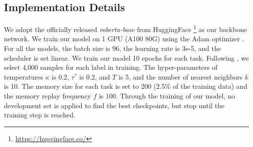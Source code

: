     









\subsection{Implementation Details}
 We adopt the officially released \textit{roberta-base} from HuggingFace \footnote{\href{https://huggingface.co/}{https://huggingface.co/}} as our backbone network.  We train our model on 1 GPU (A100 80G) using the Adam optimizer \cite{kingma2014adam}. For all the models, the batch size is 96,  the learning rate is 3e-5, and the scheduler is set linear. We train our model 10 epochs for each task. Following \citet{huang2021continual}, we select 4,000 samples for each label in training. The hyper-parameters of temperatures $\kappa$ is 0.2, $\tau^*$ is 0.2, and $T$ is 5, and the number of nearest neighbors $k$ is 10. The  memory size for each task is set to 200 (2.5\% of the training data) and the memory replay frequency $f$ is 100.  Through the training of our model, no development set is applied to find the best checkpoints, but stop until the training step is reached.






